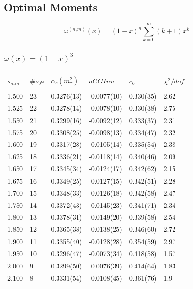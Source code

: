\documentclass[../../index.tex]{subfiles}
\begin{document}
\subsection{Optimal Moments}

\begin{equation}
  \omega^{(n,m)}(x) = (1-x)^n\sum_{k=0}^m (k+1)x^k 
\end{equation}
\subsubsection{$\omega(x) = (1-x)^3$}
\begin{table}[H]
  \centering
  \begin{tabular}{llllll}
    \toprule \\
    $s_{min}$ & \#$s_0$s & $\alpha_s(m_\tau^2)$ & $aGGInv$ & $c_{6}$ & $\chi^2/dof$  \\
    \hline \\
    1.500 & 23 & 0.3276(13) & -0.0077(10) & 0.330(35) & 2.62 \\
    1.525 & 22 & 0.3278(14) & -0.0078(10) & 0.330(38) & 2.75 \\
    1.550 & 21 & 0.3299(16) & -0.0092(12) & 0.333(37) & 2.31 \\
    1.575 & 20 & 0.3308(25) & -0.0098(13) & 0.334(47) & 2.32 \\
    1.600 & 19 & 0.3317(28) & -0.0105(14) & 0.335(54) & 2.38 \\
    1.625 & 18 & 0.3336(21) & -0.0118(14) & 0.340(46) & 2.09 \\
    1.650 & 17 & 0.3345(34) & -0.0124(17) & 0.342(62) & 2.15 \\
    1.675 & 16 & 0.3349(25) & -0.0127(15) & 0.342(51) & 2.28 \\
    1.700 & 15 & 0.3348(33) & -0.0126(18) & 0.342(58) & 2.47 \\
    1.750 & 14 & 0.3372(43) & -0.0145(23) & 0.341(71) & 2.34 \\
    1.800 & 13 & 0.3378(31) & -0.0149(20) & 0.339(58) & 2.54 \\
    1.850 & 12 & 0.3365(38) & -0.0138(25) & 0.346(60) & 2.72 \\
    1.900 & 11 & 0.3355(40) & -0.0128(28) & 0.354(59) & 2.97 \\
    1.950 & 10 & 0.3296(47) & -0.0073(34) & 0.418(58) & 1.57 \\
    2.000 & 9  & 0.3299(50) & -0.0076(39) & 0.414(64) & 1.83 \\
    2.100 & 8  & 0.3331(54) & -0.0108(45) & 0.361(76) & 1.9 \\

\end{tabular}
\end{table}
\end{document}
